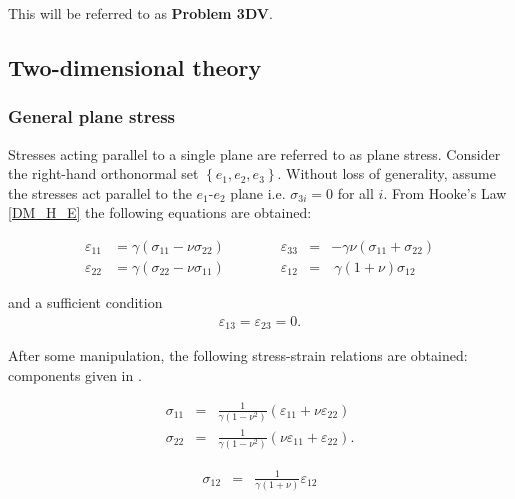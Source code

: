 			This will be referred to as \textbf{Problem 3DV}.

	\subsection{Two-dimensional theory}
		\subsubsection*{General plane stress}
			Stresses acting parallel to a single plane are referred to as plane stress. 
			Consider the right-hand orthonormal set $\left\{e_1, e_2, e_3\right\}$. Without
			loss of generality, assume the stresses act parallel to the $e_1$-$e_2$ plane
			i.e. $\sigma_{3i} = 0$ for all $i$. From Hooke's Law \eqref{DM_H_E} the
			following equations are obtained: \label{sym:e_i}

			\begin{equation}
				\begin{aligned}
					\varepsilon_{11} & =  \gamma  ( \sigma_{11} - \nu \sigma_{22}) \qquad \qquad \varepsilon_{33} & = & - \gamma \nu (\sigma_{11} + \sigma_{22})          \\
					\varepsilon_{22} & =   \gamma (\sigma_{22} - \nu\sigma_{11}) \qquad \qquad \varepsilon_{12}   & = & \  \gamma (1+\nu) \sigma_{12} \label{strain_comp}
				\end{aligned}
			\end{equation}

			and a sufficient condition
			\begin{eqnarray}
				\varepsilon_{13} =  \varepsilon_{23} = 0.
			\end{eqnarray}

			After some manipulation, the following stress-strain relations are obtained:
			components given in \cite{Fung65}.

			\begin{minipage}{.5\linewidth}
				\begin{eqnarray*}
					\sigma_{11} & = & \frac{1}{\gamma(1-\nu^2)} ( \varepsilon_{11} + \nu\varepsilon_{22})\\
					\sigma_{22} & = & \frac{1}{\gamma(1-\nu^2)} (\nu \varepsilon_{11} + \varepsilon_{22}).
				\end{eqnarray*}
			\end{minipage}%
			\begin{minipage}{.5\linewidth}
				\begin{eqnarray}
					\sigma_{12} & = & \frac{1}{\gamma(1+\nu)} \varepsilon_{12} \label{stress_comp}
				\end{eqnarray}
			\end{minipage}


